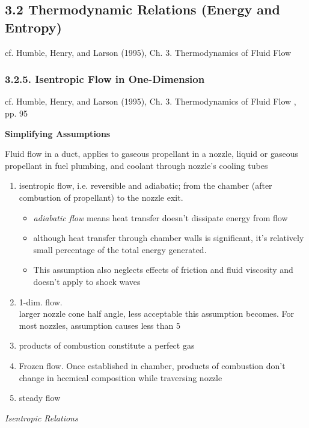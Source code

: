 \documentclass[10pt]{amsart}
\begin{document}
\begin{multicols*}{2}
\subsection{3.2 Thermodynamic Relations (Energy and Entropy)}

cf. Humble, Henry, and Larson (1995), Ch. 3. Thermodynamics of Fluid Flow \cite{HHL1995}

\subsubsection{3.2.5. Isentropic Flow in One-Dimension}

cf. Humble, Henry, and Larson (1995), Ch. 3. Thermodynamics of Fluid Flow \cite{HHL1995}, pp. 95

\textbf{Simplifying Assumptions}

Fluid flow in a duct, applies to gaseous propellant in a nozzle, liquid or gaseous propellant in fuel plumbing, and coolant through nozzle's cooling tubes

\begin{enumerate}
\item isentropic flow, i.e. reversible and adiabatic; from the chamber (after combustion of propellant) to the nozzle exit. 
  \begin{itemize}
    \item \emph{adiabatic flow} means heat transfer doesn't dissipate energy from flow 
    \item   although heat transfer through chamber walls is significant, it's relatively small percentage of the total energy generated.
    \item This assumption also neglects effects of friction and fluid viscosity and doesn't apply to shock waves
  \end{itemize}
\item 1-dim. flow.\\

  larger nozzle cone half angle, less acceptable this assumption becomes.  For most nozzles, assumption causes less than 5%
\item products of combustion constitute a perfect gas
\item Frozen flow.  Once established in chamber, products of combustion don't change in hcemical composition while traversing nozzle
  \item steady flow
  \end{enumerate}

\emph{Isentropic Relations}  


\end{multicols*}
\end{document}
